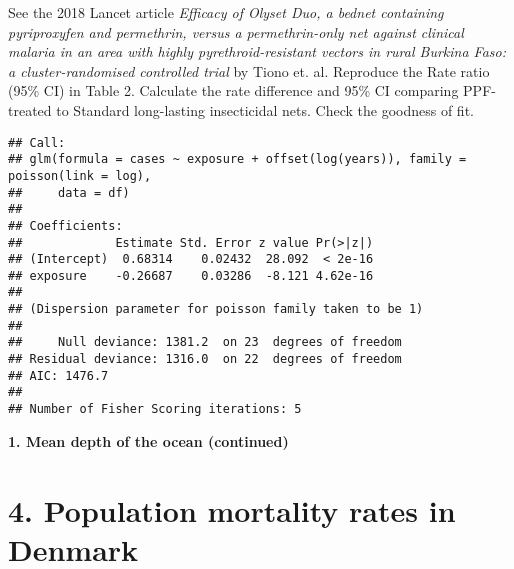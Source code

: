 \documentclass[10pt,handout]{beamer}\usepackage[]{graphicx}\usepackage[]{color}
\makeatletter
\newenvironment{kframe}{%
 \def\at@end@of@kframe{}%
 \ifinner\ifhmode%
  \def\at@end@of@kframe{\end{minipage}}%
  \begin{minipage}{\columnwidth}%
 \fi\fi%
 \def\FrameCommand##1{\hskip\@totalleftmargin \hskip-\fboxsep
 \colorbox{shadecolor}{##1}\hskip-\fboxsep
     \hskip-\linewidth \hskip-\@totalleftmargin \hskip\columnwidth}%
 \MakeFramed {\advance\hsize-\width
   \@totalleftmargin\z@ \linewidth\hsize
   \@setminipage}}%
 {\par\unskip\endMakeFramed%
 \at@end@of@kframe}
\newenvironment{knitrout}{}{} %
\makeatother
\begin{document}
\begin{frame}
		\vspace*{-1.091in}
\tiny
See the 2018 Lancet article \textit{Efficacy of Olyset Duo, a bednet containing pyriproxyfen and permethrin, versus a permethrin-only net against clinical malaria in an area with highly pyrethroid-resistant vectors in rural Burkina Faso: a cluster-randomised controlled trial} by Tiono et. al. Reproduce the Rate ratio (95\% CI) in Table 2. Calculate the rate difference and 95\% CI comparing PPF-treated to Standard long-lasting insecticidal nets. Check the goodness of fit. 




\begin{knitrout}\tiny
{}\color{fgcolor}\begin{kframe}
\begin{verbatim}
## Call:
## glm(formula = cases ~ exposure + offset(log(years)), family = poisson(link = log), 
##     data = df)
## 
## Coefficients:
##             Estimate Std. Error z value Pr(>|z|)
## (Intercept)  0.68314    0.02432  28.092  < 2e-16
## exposure    -0.26687    0.03286  -8.121 4.62e-16
## 
## (Dispersion parameter for poisson family taken to be 1)
## 
##     Null deviance: 1381.2  on 23  degrees of freedom
## Residual deviance: 1316.0  on 22  degrees of freedom
## AIC: 1476.7
## 
## Number of Fisher Scoring iterations: 5
\end{verbatim}
\end{kframe}
\end{knitrout}

\end{frame}


\begin{frame}
	\vspace*{-5.0in}
	\textbf{1. Mean depth of the ocean (continued)}
	
\end{frame}


\section{4. Population mortality rates in Denmark}
\end{document}
